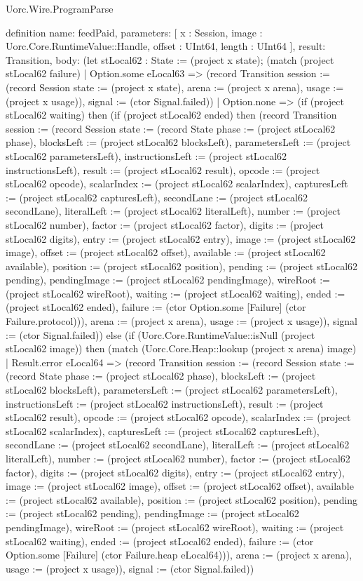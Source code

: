 \begin{lexlean}{Uorc.Wire.ProgramParse}
\begin{semanticmodule}
definition{
  name: feedPaid,
  parameters: [
    x : Session,
    image : Uorc.Core.RuntimeValue::Handle,
    offset : UInt64,
    length : UInt64
  ],
  result: Transition,
  body: (let stLocal62 : State := (project x state); (match (project stLocal62 failure)
    | Option.some eLocal63 => (record Transition {session := (record Session {state := (project x state), arena := (project x arena), usage := (project x usage)}), signal := (ctor Signal.failed)})
    | Option.none => (if (project stLocal62 waiting) then (if (project stLocal62 ended) then (record Transition {session := (record Session {state := (record State {phase := (project stLocal62 phase), blocksLeft := (project stLocal62 blocksLeft), parametersLeft := (project stLocal62 parametersLeft), instructionsLeft := (project stLocal62 instructionsLeft), result := (project stLocal62 result), opcode := (project stLocal62 opcode), scalarIndex := (project stLocal62 scalarIndex), capturesLeft := (project stLocal62 capturesLeft), secondLane := (project stLocal62 secondLane), literalLeft := (project stLocal62 literalLeft), number := (project stLocal62 number), factor := (project stLocal62 factor), digits := (project stLocal62 digits), entry := (project stLocal62 entry), image := (project stLocal62 image), offset := (project stLocal62 offset), available := (project stLocal62 available), position := (project stLocal62 position), pending := (project stLocal62 pending), pendingImage := (project stLocal62 pendingImage), wireRoot := (project stLocal62 wireRoot), waiting := (project stLocal62 waiting), ended := (project stLocal62 ended), failure := (ctor Option.some [Failure] (ctor Failure.protocol))}), arena := (project x arena), usage := (project x usage)}), signal := (ctor Signal.failed)}) else (if (Uorc.Core.RuntimeValue::isNull (project stLocal62 image)) then (match (Uorc.Core.Heap::lookup (project x arena) image)
      | Result.error eLocal64 => (record Transition {session := (record Session {state := (record State {phase := (project stLocal62 phase), blocksLeft := (project stLocal62 blocksLeft), parametersLeft := (project stLocal62 parametersLeft), instructionsLeft := (project stLocal62 instructionsLeft), result := (project stLocal62 result), opcode := (project stLocal62 opcode), scalarIndex := (project stLocal62 scalarIndex), capturesLeft := (project stLocal62 capturesLeft), secondLane := (project stLocal62 secondLane), literalLeft := (project stLocal62 literalLeft), number := (project stLocal62 number), factor := (project stLocal62 factor), digits := (project stLocal62 digits), entry := (project stLocal62 entry), image := (project stLocal62 image), offset := (project stLocal62 offset), available := (project stLocal62 available), position := (project stLocal62 position), pending := (project stLocal62 pending), pendingImage := (project stLocal62 pendingImage), wireRoot := (project stLocal62 wireRoot), waiting := (project stLocal62 waiting), ended := (project stLocal62 ended), failure := (ctor Option.some [Failure] (ctor Failure.heap eLocal64))}), arena := (project x arena), usage := (project x usage)}), signal := (ctor Signal.failed)})
}
\end{semanticmodule}
\end{lexlean}
